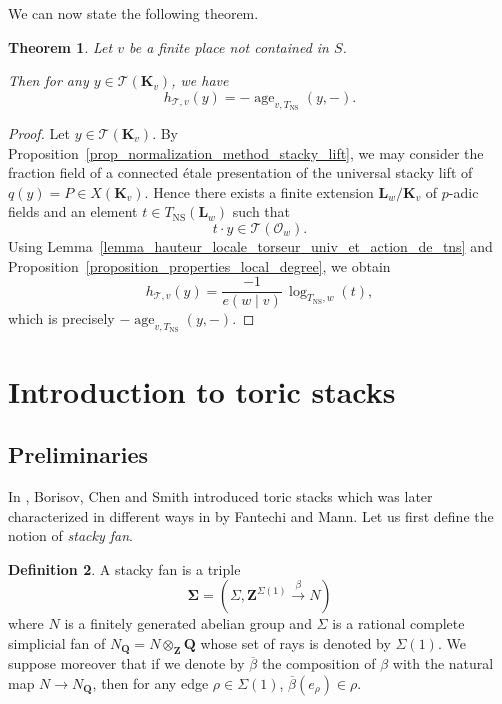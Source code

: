 \documentclass{proc-l}
\newcommand{\Z}{\mathbf{Z}}
\newcommand{\K}{\mathbf{K}}
\newcommand{\Q}{\mathbf{Q}}
\newcommand{\Le}{\mathbf{L}}
\DeclareMathOperator{\age}{age}
\DeclareMathOperator{\NS}{NS}
\newcommand{\stackT}{\mathcal{T}}
\newcommand{\sheafO}{\mathcal{O}}
\newtheorem{theorem}{Theorem}[section]
\theoremstyle{definition}
\newtheorem{definition}[theorem]{Definition}
\theoremstyle{remark}
\numberwithin{equation}{section}
\begin{document}
We can now state the following theorem.

\begin{theorem}\label{theorem_local_degree_local_age}
Let $v$ be a finite place not contained in $S$.

Then for any
$y \in \stackT(\K_v)$, we have
\[
h_{\stackT,v}(y) = - \age_{v,T_{\NS}}(y,-).
\]
\end{theorem}

\begin{proof}
Let $y \in \stackT(\K_v)$. By
Proposition~\ref{prop_normalization_method_stacky_lift}, we may consider the fraction
field of a connected étale presentation of the universal stacky lift of
$q(y) = P \in X(\K_v)$. Hence there exists a finite extension
$\Le_w / \K_v$ of $p$-adic fields and an element $t \in T_{\NS}(\Le_w)$ such that
\[
t \cdot y \in \stackT(\sheafO_w).
\]
Using Lemma~\ref{lemma_hauteur_locale_torseur_univ_et_action_de_tns} and
Proposition~\ref{proposition_properties_local_degree}, we obtain
\[
h_{\stackT,v}(y)
=
\frac{- 1}{e(w \mid v)}\, \log_{T_{\NS},w}(t),
\]
which is precisely $- \age_{v,T_{\NS}}(y,-)$.
\end{proof}













\section{Introduction to toric stacks}

\subsection{Preliminaries}



In \cite{borisov_toric_stack}, Borisov, Chen and Smith introduced toric stacks which was later characterized in different ways in \cite{fantechi_toric_stack} by Fantechi and Mann. Let us first define the notion of \textit{stacky fan}.



\begin{definition}\label{definition_stacky_fan_toric_stack}
    A stacky fan is a triple $$\mathbf{\Sigma} = (\Sigma,\Z^{\Sigma(1)} \xrightarrow{\beta} N)$$ where $N$ is a finitely generated abelian group and $\Sigma$ is a rational complete simplicial fan of $N_{\Q} = N \otimes_{\Z} \Q $ whose set of rays is denoted by $\Sigma(1)$. We suppose moreover that if we denote by $\overline{\beta}$ the composition of $\beta$ with the natural map $N \rightarrow N_{\Q}$, then for any edge $\rho \in \Sigma(1)$, $\overline{\beta}(e_{\rho}) \in \rho$.
\end{definition}
\end{document}

